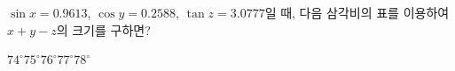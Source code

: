$\sin x=0.9613$, $\cos y=0.2588$, $\tan z=3.0777$일 때, 다음 삼각비의 표를 이용하여 $x+y-z$의 크기를 구하면?
\par\smallskip\begin{center}\resizebox{\ifdim\width>\linewidth\linewidth\else\width\fi}{!}{}\end{center}
\begin{choices32}{$74^\circ$}{$75^\circ$}{$76^\circ$}{$77^\circ$}{$78^\circ$}\end{choices32}
